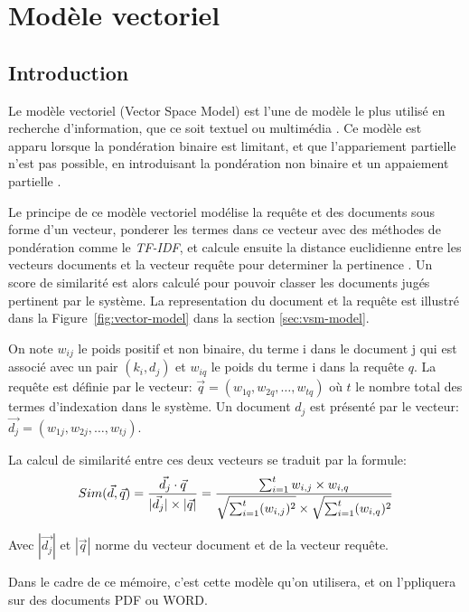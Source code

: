 \chapter{Modèle vectoriel}
\section{Introduction}
Le modèle vectoriel (Vector Space Model) est l'une de modèle le plus utilisé en recherche d'information, que ce soit textuel  ou multimédia \citep{vsm-images}. Ce modèle est apparu lorsque la pondération binaire est limitant, et que l'appariement partielle n'est pas possible, en introduisant la pondération non binaire et un appaiement partielle \citep{modern-ir}.

Le principe de ce modèle vectoriel modélise la requête et des documents sous forme d'un vecteur, ponderer les termes dans ce vecteur avec des méthodes de pondération comme le \emph{TF-IDF}, et calcule ensuite la distance euclidienne entre les vecteurs documents et la vecteur requête pour determiner la pertinence \citep{ir-on-web}. Un score de similarité est alors calculé pour pouvoir classer les documents jugés pertinent par le système. La representation du document et la requête est illustré dans la Figure~\ref{fig:vector-model} dans la section \ref{sec:vsm-model}.

\begin{definition}
    On note $w_{ij}$ le poids positif et non binaire, du terme i dans le document j qui est associé avec un pair $(k_{i}, d_{j})$ et $w_{iq}$ le poids du terme i dans la requête $q$. La requête est définie par le vecteur: $ \vec{q} = (w_{1q}, w_{2q}, \dots, w_{tq}) $ où $t$ le nombre total des termes d'indexation dans le système. Un document $d_{j}$ est présenté par le vecteur: $ \vec{d_{j}} = (w_{1j}, w_{2j}, \dots, w_{tj}) $.

    La calcul de similarité entre ces deux vecteurs se traduit par la formule:
    \[
        Sim(\vec{d}, \vec{q}) = \frac{\vec{d_{j}} \cdot \vec{q}}{ |\vec{d_{j}}| \times |\vec{q}| } \\
        = \frac{\sum_{i=1}^{t} w_{i,j} \times w_{i,q}}{\sqrt{\sum_{i=1}^{t} (w_{i,j})^2} \times \sqrt{\sum_{i=1}^{t} (w_{i,q})^2}}
    \]

    Avec $ |\vec{d_{j}}| $ et $ |\vec{q}| $ norme du vecteur document et de la vecteur requête.
\end{definition}

Dans le cadre de ce mémoire, c'est cette modèle qu'on utilisera, et on l'ppliquera sur des documents PDF ou WORD.

